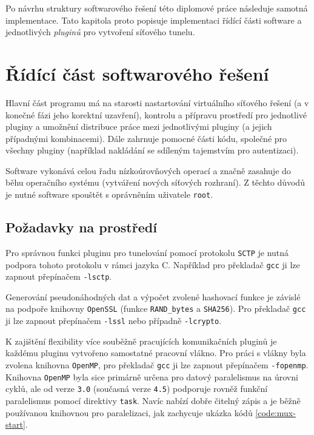 \documentclass[thesis=M,czech]{FITthesis}[2012/10/20]
\begin{document}
Po návrhu struktury softwarového řešení této diplomové práce následuje samotná implementace. Tato kapitola proto popisuje implementaci řídící části software a jednotlivých \textit{pluginů} pro vytvoření síťového tunelu.


\section{Řídící část softwarového řešení}

Hlavní část programu má na starosti nastartování virtuálního síťového řešení (a v konečné fázi jeho korektní uzavření), kontrolu a přípravu prostředí pro jednotlivé pluginy a umožnění distribuce práce mezi jednotlivými pluginy (a jejich případnými kombinacemi). Dále zahrnuje pomocné části kódu, společné pro všechny pluginy (například nakládání se sdíleným tajemstvím pro autentizaci).

Software vykonává celou řadu nízkoúrovňových operací a značně zasahuje do běhu operačního systému (vytváření nových síťových rozhraní). Z těchto důvodů je nutné software spouštět s oprávněním uživatele \texttt{root}.

\subsection{Požadavky na prostředí}

Pro správnou funkci pluginu pro tunelování pomocí protokolu \texttt{SCTP} je nutná podpora tohoto protokolu v rámci jazyka C. Například pro překladač \texttt{gcc} ji lze zapnout přepínačem \texttt{-lsctp}.

Generování pseudonáhodných dat a výpočet zvolené hashovací funkce je závislé na podpoře knihovny \texttt{OpenSSL} (funkce \texttt{RAND\_bytes} a \texttt{SHA256}). Pro překladač \texttt{gcc} ji lze zapnout přepínačem \texttt{-lssl} nebo případně \texttt{-lcrypto}.

K zajištění flexibility více souběžně pracujících komunikačních pluginů je každému pluginu vytvořeno samostatné pracovní vlákno. Pro práci s vlákny byla zvolena knihovna \texttt{OpenMP}, pro překladač \texttt{gcc} ji lze zapnout přepínačem \texttt{-fopenmp}. Knihovna \texttt{OpenMP} byla sice primárně určena pro datový paralelismus na úrovni cyklů, ale od verze \texttt{3.0} (současná verze \texttt{4.5}) podporuje rovněž funkční paralelismus pomocí direktivy \texttt{task}. Navíc nabízí dobře čitelný zápis a je běžně používanou knihovnou pro paralelizaci, jak zachycuje ukázka kódů \ref{code:mux-start}.
\end{document}
